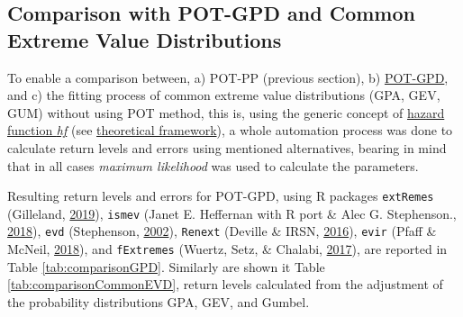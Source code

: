 \documentclass[12pt,oneside]{reedthesis}
\begin{document}
\hypertarget{comparison-with-pot-gpd-and-common-extreme-value-distributions}{%
\subsection{Comparison with POT-GPD and Common Extreme Value Distributions}\label{comparison-with-pot-gpd-and-common-extreme-value-distributions}}

To enable a comparison between, a) POT-PP (previous section), b) \protect\hyperlink{pot-gpd}{POT-GPD}, and c) the fitting process of common extreme value distributions (GPA, GEV, GUM) without using POT method, this is, using the generic concept of \protect\hyperlink{hf}{hazard function \emph{hf}} (see \protect\hyperlink{rmd-thefra}{theoretical framework}), a whole automation process was done to calculate return levels and errors using mentioned alternatives, bearing in mind that in all cases \emph{maximum likelihood} was used to calculate the parameters.

Resulting return levels and errors for POT-GPD, using R packages \texttt{extRemes} (Gilleland, \protect\hyperlink{ref-Gilleland2019}{2019}), \texttt{ismev} (Janet E. Heffernan with R port \& Alec G. Stephenson., \protect\hyperlink{ref-JanetE.HeffernanwithRport2018}{2018}), \texttt{evd} (Stephenson, \protect\hyperlink{ref-Stephenson2002}{2002}), \texttt{Renext} (Deville \& IRSN, \protect\hyperlink{ref-Deville2016}{2016}), \texttt{evir} (Pfaff \& McNeil, \protect\hyperlink{ref-Pfaff2018}{2018}), and \texttt{fExtremes} (Wuertz, Setz, \& Chalabi, \protect\hyperlink{ref-Wuertz2017}{2017}), are reported in Table \ref{tab:comparisonGPD}. Similarly are shown it Table \ref{tab:comparisonCommonEVD}, return levels calculated from the adjustment of the probability distributions GPA, GEV, and Gumbel.
\end{document}
